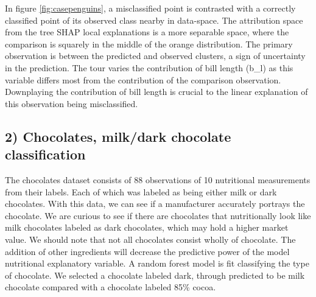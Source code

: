 \documentclass[
  article]{article}
\begin{document}
In figure \ref{fig:casepenguins}, a misclassified point is contrasted with a correctly classified point of its observed class nearby in data-space. The attribution space from the tree SHAP local explanations is a more separable space, where the comparison is squarely in the middle of the orange distribution. The primary observation is between the predicted and observed clusters, a sign of uncertainty in the prediction. The tour varies the contribution of bill length (b\_l) as this variable differs most from the contribution of the comparison observation. Downplaying the contribution of bill length is crucial to the linear explanation of this observation being misclassified.

\hypertarget{chocolates-milkdark-chocolate-classification}{%
\subsection{2) Chocolates, milk/dark chocolate classification}\label{chocolates-milkdark-chocolate-classification}}

The chocolates dataset consists of 88 observations of 10 nutritional measurements from their labels. Each of which was labeled as being either milk or dark chocolates. With this data, we can see if a manufacturer accurately portrays the chocolate. We are curious to see if there are chocolates that nutritionally look like milk chocolates labeled as dark chocolates, which may hold a higher market value. We should note that not all chocolates consist wholly of chocolate. The addition of other ingredients will decrease the predictive power of the model nutritional explanatory variable. A random forest model is fit classifying the type of chocolate. We selected a chocolate labeled dark, through predicted to be milk chocolate compared with a chocolate labeled 85\% cocoa.
\end{document}
